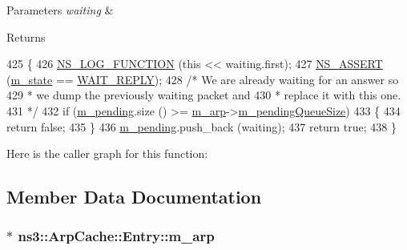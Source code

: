 \begin{DoxyParams}{Parameters}
{\em waiting} & \\
\hline
\end{DoxyParams}
\begin{DoxyReturn}{Returns}

\end{DoxyReturn}

\begin{DoxyCode}
425 \{
426   \hyperlink{log-macros-disabled_8h_a90b90d5bad1f39cb1b64923ea94c0761}{NS\_LOG\_FUNCTION} (\textcolor{keyword}{this} << waiting.first);
427   \hyperlink{assert_8h_a6dccdb0de9b252f60088ce281c49d052}{NS\_ASSERT} (\hyperlink{classns3_1_1ArpCache_1_1Entry_adb18d4ee6f4b15415822c18296a68497}{m\_state} == \hyperlink{classns3_1_1ArpCache_1_1Entry_a95a2d5d357f7306cf73e9efe4758a2eaa3a9eb00501370df59685623607504f39}{WAIT\_REPLY});
428   \textcolor{comment}{/* We are already waiting for an answer so}
429 \textcolor{comment}{   * we dump the previously waiting packet and}
430 \textcolor{comment}{   * replace it with this one.}
431 \textcolor{comment}{   */}
432   \textcolor{keywordflow}{if} (\hyperlink{classns3_1_1ArpCache_1_1Entry_a0f483e62340da794a052c71498fb0318}{m\_pending}.size () >= \hyperlink{classns3_1_1ArpCache_1_1Entry_a0f8e4d6bcbc2f2c472c97f6118eaaaee}{m\_arp}->\hyperlink{classns3_1_1ArpCache_a70391342295055352cc9cfcf34d3cc52}{m\_pendingQueueSize})
433     \{
434       \textcolor{keywordflow}{return} \textcolor{keyword}{false};
435     \}
436   \hyperlink{classns3_1_1ArpCache_1_1Entry_a0f483e62340da794a052c71498fb0318}{m\_pending}.push\_back (waiting);
437   \textcolor{keywordflow}{return} \textcolor{keyword}{true};
438 \}
\end{DoxyCode}


Here is the caller graph for this function\+:




\subsection{Member Data Documentation}
\subsubsection[{\texorpdfstring{m\+\_\+arp}{m_arp}}]{$\ast$ ns3\+::\+Arp\+Cache\+::\+Entry\+::m\+\_\+arp\hspace{0.3cm}{\ttfamily [private]}}\hypertarget{classns3_1_1ArpCache_1_1Entry_a0f8e4d6bcbc2f2c472c97f6118eaaaee}{}\label{classns3_1_1ArpCache_1_1Entry_a0f8e4d6bcbc2f2c472c97f6118eaaaee}


